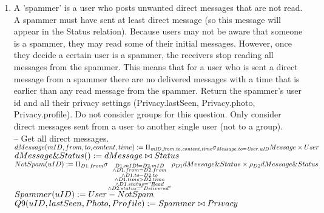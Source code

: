 \documentclass{article}
\newcommand{\var}[1]{\mathit{#1}}
\begin{document}
\begin{enumerate}
\item   %
A 'spammer' is a user who posts unwanted direct messages that are not read. A spammer must have
sent at least direct message (so this message will appear in the Status relation). Because users may not
be aware that someone is a spammer, they may read some of their initial messages. However, once they
decide a certain user is a spammer, the receivers stop reading all messages from the spammer. This
means that for a user who is sent a direct message from a spammer there are no delivered messages
with a time that is earlier than any read message from the spammer. Return the spammer's user id
and all their privacy settings (Privacy.lastSeen, Privacy.photo, Privacy.profile).
Do not consider groups for this question. Only consider direct messages sent from a user to another
single user (not to a group). \\ [5pt]
\large{
\hspace*{1cm} -- Get all direct messages. \\ [5pt]
$
dMessage(mID, from, to, content, time) := \Pi_{\var{mID}, \var{from}, \var{to}, \var{content}, \var{time}} \\
\sigma_{\var{Message.to} = \var{User.uID}} Message \times User \\ [5pt]
$
$dMessage\&Status() := dMessage \bowtie Status \\ [5pt]
$
$
NotSpam(uID) := \Pi_{D1.from} \sigma_{\substack{D1.mID != D2.mID \\
																\wedge D1.from = D2.from \\
																\wedge D1.to = D2.to \\
																\wedge D1.time > D2.time \\
																\wedge D1.status = "Read \\
																\wedge D2.status = "Delivered"}}
																\rho_{D1} dMessage\&Status \times \\
																\rho_{D2} dMessage\&Status \\ [5pt]
$
$
Spammer(uID) := User - NotSpam\\ [5pt]
$
$
Q9(uID, lastSeen, Photo, Profile) := Spammer \bowtie Privacy \\ [5pt]													
$
}


\end{enumerate}



\end{document}
